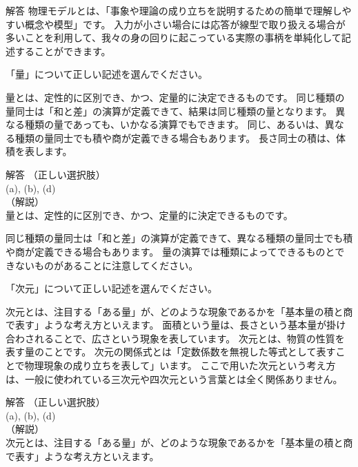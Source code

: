 \documentclass[uplatex,dvipdfmx,a4paper,11pt]{jsarticle}
\begin{document}
\begin{qlist}
\begin{itembox}[l]{解答}
        物理モデルとは、「事象や理論の成り立ちを説明するための簡単で理解しやすい概念や模型」です。
        入力が小さい場合には応答が線型で取り扱える場合が多いことを利用して、我々の身の回りに起こっている実際の事柄を単純化して記述することができます。
    \end{itembox}
	\qitem 「量」について正しい記述を選んでください。
		\begin{qlist2}
			\qitem 量とは、定性的に区別でき、かつ、定量的に決定できるものです。
			\qitem 同じ種類の量同士は「和と差」の演算が定義できて、結果は同じ種類の量となります。
			\qitem 異なる種類の量であっても、いかなる演算でもできます。
			\qitem 同じ、あるいは、異なる種類の量同士でも積や商が定義できる場合もあります。
			\qitem 長さ同士の積は、体積を表します。
    \end{qlist2}
    \vspace{3mm}
    \begin{itembox}[l]{解答}
        （正しい選択肢）\\
        (a), (b), (d)\\
        （解説）\\
        量とは、定性的に区別でき、かつ、定量的に決定できるものです。
        
        同じ種類の量同士は「和と差」の演算が定義できて、異なる種類の量同士でも積や商が定義できる場合もあります。
        量の演算では種類によってできるものとできないものがあることに注意してください。
    \end{itembox}
	\qitem 「次元」について正しい記述を選んでください。
		\begin{qlist2}
			\qitem 次元とは、注目する「ある量」が、どのような現象であるかを「基本量の積と商で表す」ような考え方といえます。
			\qitem 面積という量は、長さという基本量が掛け合わされることで、広さという現象を表しています。
			\qitem 次元とは、物質の性質を表す量のことです。
			\qitem 次元の関係式とは「定数係数を無視した等式として表すことで物理現象の成り立ちを表して」います。
			\qitem ここで用いた次元という考え方は、一般に使われている三次元や四次元という言葉とは全く関係ありません。
		\end{qlist2}
    \vspace{3mm}
    \begin{itembox}[l]{解答}
        （正しい選択肢）\\
        (a), (b), (d)\\
        （解説）\\
        次元とは、注目する「ある量」が、どのような現象であるかを「基本量の積と商で表す」ような考え方といえます。
        

\end{itembox}
\end{qlist}
\end{document}
